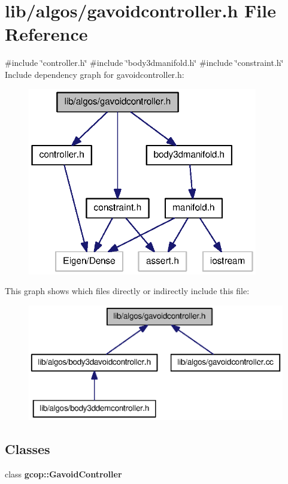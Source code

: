 \section{lib/algos/gavoidcontroller.h \-File \-Reference}
\label{gavoidcontroller_8h}
{\ttfamily \#include \char`\"{}controller.\-h\char`\"{}}\*
{\ttfamily \#include \char`\"{}body3dmanifold.\-h\char`\"{}}\*
{\ttfamily \#include \char`\"{}constraint.\-h\char`\"{}}\*
\-Include dependency graph for gavoidcontroller.\-h\-:
\nopagebreak
\begin{figure}[H]
\begin{center}
\leavevmode
\includegraphics[width=284pt]{gavoidcontroller_8h__incl}
\end{center}
\end{figure}
\-This graph shows which files directly or indirectly include this file\-:
\nopagebreak
\begin{figure}[H]
\begin{center}
\leavevmode
\includegraphics[width=350pt]{gavoidcontroller_8h__dep__incl}
\end{center}
\end{figure}
\subsection*{\-Classes}
\begin{DoxyCompactItemize}
\item 
class {\bf gcop\-::\-Gavoid\-Controller}
\end{DoxyCompactItemize}
